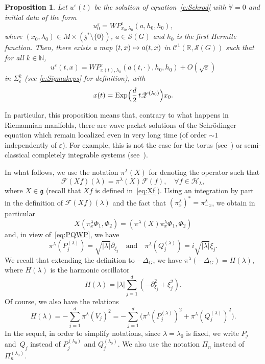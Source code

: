 \documentclass[10pt]{amsart}
\let\mathcal\mathscr
\newcommand\mto{\mathchoice{\longmapsto}{\mapsto}{\mapsto}{\mapsto}}
\DeclareMathOperator{\Exp}{Exp}
\theoremstyle{plain}
\newtheorem{proposition}[theorem]{Proposition}
\theoremstyle{definition}
\let\eps\varepsilon
\def\R{{\mathbb R}}
\def\N{{\mathbb N}}
\def\bbV{{\mathbb V}}
\begin{document}
\begin{proposition} \label{p:wpschrod}
Let $u^\eps(t)$ be the solution of equation~\eqref{e:Schrod} with $\bbV=0$ and initial data of the form
\[
u^\eps_0= WP^\eps_{x_0,\lambda_0} (a,h_0,h_0),
\]
where $(x_0,\lambda_0)\in M\times (\mathfrak z^*\setminus\{0\}) $, $a\in{\mathcal S}(G)$ and $h_0$ is the first Hermite function.
Then, there exists a map $(t,x)\mto a(t,x)$ in $\mathcal C^1(\R, {\mathcal S}(G))$ such that for all $k\in \N$,
\[
u^\eps(t,x) = WP^\eps_{x(t),\lambda_0} (a(t,\cdot),h_0,h_0)+O(\sqrt\eps)
\]
in $\Sigma^k_\eps$ (see \eqref{e:Sigmakeps} for definition), with
\[
x(t)= \Exp\Bigl(\frac{d}{2}\, t{\mathcal Z}^{(\lambda_0)} \Bigr) x_0.
\]
\end{proposition}
In particular, this proposition means that, contrary to what happens in Riemannian manifolds, there are wave packet solutions of the Schrödinger equation which \hbox{remain} localized even in very long time (of order $\sim 1$ independently of $\eps$). For example, this is not the case for the torus (see~\cite{AM14,BZ}) or semi-classical completely integrable systems (see~\cite{AFM15}).

In what follows, we use the notation $\pi^\lambda(X)$ for denoting the operator such that
\[
\mathcal F (Xf)(\lambda) =\pi^\lambda(X)\mathcal F(f),\quad \forall f\in \mathcal H_\lambda,
\]
where $X\in \mathfrak g$ (recall that $Xf$ is defined in~\eqref{eq:Xf}).
Using an integration by part in the definition of $\mathcal F (Xf)(\lambda)$ and the fact that $(\pi_x^\lambda)^*=\pi_{-x}^\lambda$, we obtain in particular
\begin{equation*}%
X (\pi^\lambda_x \Phi_1,\Phi_2)= (\pi^\lambda(X)\pi^\lambda_x \Phi_1,\Phi_2)
\end{equation*}
and, in view of~\eqref{eq:PQWP}, we have
\begin{equation} \label{e:comppilambda}
\pi^\lambda(P_j^{(\lambda)})= \sqrt{|\lambda|} \partial_{\xi_j}\quad \mbox{and}\quad \pi^\lambda(Q_j^{(\lambda)})=i \sqrt{|\lambda|} {\xi_j}.
\end{equation}
We recall that extending the definition to $-\Delta_G$, we have $\pi^\lambda(-\Delta_G)= H(\lambda)$, where $H(\lambda)$ is the harmonic oscillator
\begin{equation} \label{e:compHlambda}
H(\lambda)= |\lambda| \sum_{j=1}^{d} (-\partial_{\xi_j} ^2 +\xi_j^2).
\end{equation}
Of course, we also have the relations
\begin{equation*}%
H(\lambda)= -\sum_{j=1}^{d} \pi^\lambda (V_j)^2 =- \sum_{j=1}^{d} \bigl(\pi^\lambda (P^{(\lambda)}_j)^2 +\pi^\lambda (Q^{(\lambda)}_j)^2\bigr).
\end{equation*}
In the sequel, in order to simplify notations, since $\lambda=\lambda_0$ is fixed, we write $P_j$ and~$Q_j$ instead of $P_j^{(\lambda_0)}$ and $Q_j^{(\lambda_0)}$. We also use the notation $\Pi_n$ instead of $\Pi_n^{(\lambda_0)}$.
\end{document}
